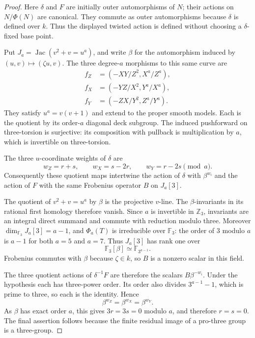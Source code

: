 \begin{proof}
Here $\delta$ and $F$ are initially outer automorphisms of $N$;
their actions on $N/\Phi(N)$ are canonical. They commute as outer
automorphisms because $\delta$ is defined over $k$. Thus the
displayed twisted action is defined without choosing a
$\delta$-fixed base point.

Put $J_a=\operatorname{Jac}(v^2+v=u^a)$, and write $\beta$ for
the automorphism induced by $(u,v)\mapsto(\zeta u,v)$.
The three degree-$a$ morphisms to this same curve are
\[
 \begin{split}
 f_Z&=(-XY/Z^2,X^a/Z^a),\\
 f_X&=(-YZ/X^2,Y^a/X^a),\\
 f_Y&=(-ZX/Y^2,Z^a/Y^a).
 \end{split}
\]
They satisfy $u^a=v(v+1)$ and extend to the proper smooth models.
Each is the quotient by its order-$a$ diagonal deck subgroup.
The induced pushforward on three-torsion is surjective: its
composition with pullback is multiplication by $a$, which is
invertible on three-torsion.

The three $u$-coordinate weights of $\delta$ are
\[
 w_Z=r+s,\qquad w_X=s-2r,\qquad w_Y=r-2s
 \pmod a.
\]
Consequently these quotient maps intertwine the action of
$\delta$ with $\beta^{w_i}$ and the action of $F$ with the same
Frobenius operator $B$ on $J_a[3]$.

The quotient of $v^2+v=u^a$ by $\beta$ is the projective $v$-line.
The $\beta$-invariants in its rational first homology therefore
vanish. Since $a$ is invertible in $\mathbb Z_3$, invariants are
an integral direct summand and commute with reduction modulo three.
Moreover $\dim_{\mathbb F_3}J_a[3]=a-1$, and $\Phi_a(T)$ is
irreducible over $\mathbb F_3$: the order of $3$ modulo $a$ is
$a-1$ for both $a=5$ and $a=7$. Thus $J_a[3]$ has rank one over
\[
 \mathbb F_3[\beta]\simeq\mathbb F_{3^{a-1}}.
\]
Frobenius commutes with $\beta$ because $\zeta\in k$, so $B$ is
a nonzero scalar in this field.

The three quotient actions of $\delta^{-1}F$ are therefore the
scalars $B\beta^{-w_i}$. Under the hypothesis each has
three-power order. Its order also divides $3^{a-1}-1$, which is
prime to three, so each is the identity. Hence
\[
 \beta^{w_Z}=\beta^{w_X}=\beta^{w_Y}.
\]
As $\beta$ has exact order $a$, this gives $3r=3s=0$ modulo $a$,
and therefore $r=s=0$. The final assertion follows because the
finite residual image of a pro-three group is a three-group.
\end{proof}

